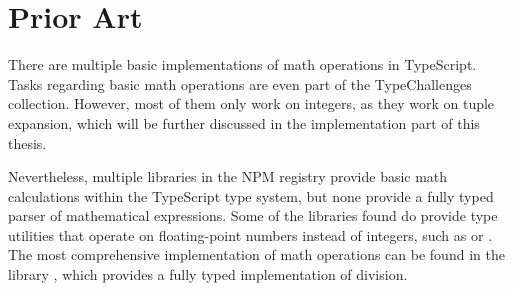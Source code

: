 \section{Prior Art}

There are multiple basic implementations of math operations in TypeScript. Tasks regarding basic math operations are even part of the TypeChallenges collection\cite{TypechallengesTypechallenges2023}. However, most of them only work on integers, as they work on tuple expansion, which will be further discussed in the implementation part of this thesis. 

Nevertheless, multiple libraries in the NPM registry provide basic math calculations within the TypeScript type system, but none provide a fully typed parser of mathematical expressions. Some of the libraries found do provide type utilities that operate on floating-point numbers instead of integers, such as  \cite{sorhusSindresorhusTypefest2023} or \cite{kawayilinlinKawayiLinLinTypescriptlodash2023}. The most comprehensive implementation of math operations can be found in the  library \cite{arielTypeLevelArithmetic2023}, which provides a fully typed implementation of division.

